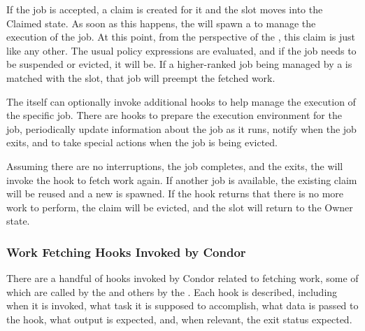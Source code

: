 If the job is accepted, a claim is created for it and the slot moves
into the Claimed state.
As soon as this happens, the  will spawn a
 to manage the execution of the job.
At this point, from the perspective of the , this claim
is just like any other.
The usual policy expressions are evaluated, and if the job needs to be
suspended or evicted, it will be.
If a higher-ranked job being managed by a  is matched
with the slot, that job will preempt the fetched work.

The  itself can optionally invoke additional hooks to
help manage the execution of the specific job.
There are hooks to prepare the execution environment for the job,
periodically update information about the job as it runs, notify when
the job exits, and to take special actions when the job is being evicted.

Assuming there are no interruptions, the job completes, and the
 exits, the  will invoke the hook to
fetch work again.
If another job is available, the existing claim will be reused and a
new  is spawned.
If the hook returns that there is no more work to perform, the claim
will be evicted, and the slot will return to the Owner state.


\subsubsection{\label{sec:job-hooks-hooks}
Work Fetching Hooks Invoked by Condor}

There are a handful of hooks invoked by Condor related to fetching
work, some of which are called by the  and others by
the .
Each hook is described, including when it is invoked, what
task it is supposed to accomplish, what data is passed to the hook,
what output is expected, and, when relevant, the exit status expected.


